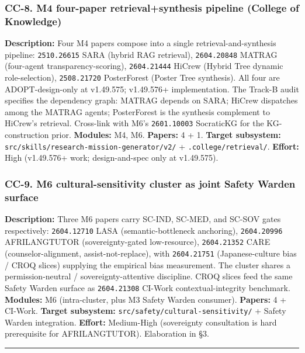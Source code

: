 \documentclass[11pt,letterpaper]{article}
\newcommand{\arxivid}[1]{\texttt{\textcolor{accent}{#1}}}
\begin{document}
\subsubsection{CC-8. M4 four-paper retrieval+synthesis pipeline (College
of
Knowledge)}

\textbf{Description:} Four M4 papers compose into a single
retrieval-and-synthesis pipeline: \arxivid{2510.26615} SARA (hybrid RAG
retrieval), \arxivid{2604.20848} MATRAG (four-agent
transparency-scoring), \arxivid{2604.21444} HiCrew (Hybrid Tree dynamic
role-selection), \arxivid{2508.21720} PosterForest (Poster Tree
synthesis). All four are ADOPT-design-only at v1.49.575; v1.49.576+
implementation. The Track-B audit specifies the dependency graph: MATRAG
depends on SARA; HiCrew dispatches among the MATRAG agents; PosterForest
is the synthesis complement to HiCrew's retrieval. Cross-link with M6's
\arxivid{2601.10003} SocraticKG for the KG-construction prior.
\textbf{Modules:} M4, M6. \textbf{Papers:} 4 + 1. \textbf{Target
subsystem:} \texttt{src/skills/research-mission-generator/v2/} +
\texttt{.college/retrieval/}. \textbf{Effort:} High (v1.49.576+ work;
design-and-spec only at v1.49.575).

\subsubsection{CC-9. M6 cultural-sensitivity cluster as joint Safety
Warden
surface}

\textbf{Description:} Three M6 papers carry SC-IND, SC-MED, and SC-SOV
gates respectively: \arxivid{2604.12710} LASA (semantic-bottleneck
anchoring), \arxivid{2604.20996} AFRILANGTUTOR (sovereignty-gated
low-resource), \arxivid{2604.21352} CARE (counselor-alignment,
assist-not-replace), with \arxivid{2604.21751} (Japanese-culture bias /
CROQ slices) supplying the empirical bias measurement. The cluster
shares a permission-neutral / sovereignty-attentive discipline. CROQ
slices feed the same Safety Warden surface as \arxivid{2604.21308}
CI-Work contextual-integrity benchmark. \textbf{Modules:} M6
(intra-cluster, plus M3 Safety Warden consumer). \textbf{Papers:} 4 +
CI-Work. \textbf{Target subsystem:}
\texttt{src/safety/cultural-sensitivity/} + Safety Warden integration.
\textbf{Effort:} Medium-High (sovereignty consultation is hard
prerequisite for AFRILANGTUTOR). Elaboration in §3.

\begin{center}\rule{0.5\linewidth}{0.5pt}\end{center}
\end{document}
